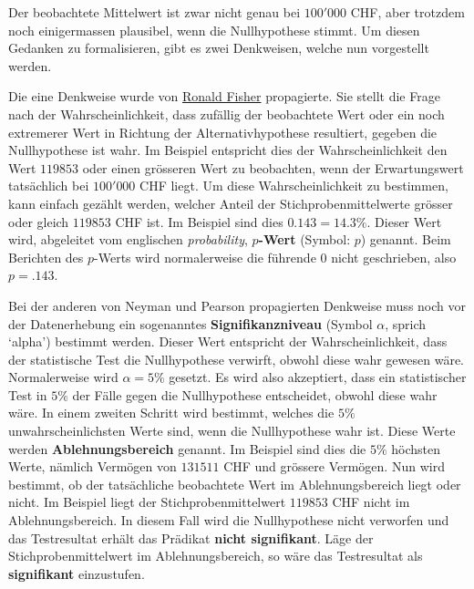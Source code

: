 \documentclass[
]{book}
\theoremstyle{definition}
\theoremstyle{definition}
\theoremstyle{definition}
\theoremstyle{definition}
\theoremstyle{remark}
\begin{document}
Der beobachtete Mittelwert ist zwar nicht genau bei \(100'000\) CHF, aber trotzdem noch einigermassen plausibel, wenn die Nullhypothese stimmt. Um diesen Gedanken zu formalisieren, gibt es zwei Denkweisen, welche nun vorgestellt werden.

Die eine Denkweise wurde von \href{https://en.wikipedia.org/wiki/Ronald_Fisher}{Ronald Fisher} propagierte. Sie stellt die Frage nach der Wahrscheinlichkeit, dass zufällig der beobachtete Wert oder ein noch extremerer Wert in Richtung der Alternativhypothese resultiert, gegeben die Nullhypothese ist wahr. Im Beispiel entspricht dies der Wahrscheinlichkeit den Wert \(119853\) oder einen grösseren Wert zu beobachten, wenn der Erwartungswert tatsächlich bei \(100'000\) CHF liegt. Um diese Wahrscheinlichkeit zu bestimmen, kann einfach gezählt werden, welcher Anteil der Stichprobenmittelwerte grösser oder gleich \(119853\) CHF ist. Im Beispiel sind dies \(0.143 = 14.3\%\). \label{customdef-pwert}{Dieser Wert wird, abgeleitet vom englischen \emph{probability}, \textbf{\(p\)-Wert} (Symbol: \(p\)) genannt. Beim Berichten des \(p\)-Werts wird normalerweise die führende \(0\) nicht geschrieben, also \(p = .143\).}

\label{customdef-signifikanzniveau}{Bei der anderen von Neyman und Pearson propagierten Denkweise muss noch vor der Datenerhebung ein sogenanntes \textbf{Signifikanzniveau} (Symbol \(\alpha\), sprich `alpha') bestimmt werden. Dieser Wert entspricht der Wahrscheinlichkeit, dass der statistische Test die Nullhypothese verwirft, obwohl diese wahr gewesen wäre. Normalerweise wird \(\alpha = 5\%\) gesetzt.} Es wird also akzeptiert, dass ein statistischer Test in \(5\%\) der Fälle gegen die Nullhypothese entscheidet, obwohl diese wahr wäre. \label{customdef-ablehnungsbereich}{In einem zweiten Schritt wird bestimmt, welches die \(5\%\) unwahrscheinlichsten Werte sind, wenn die Nullhypothese wahr ist. Diese Werte werden \textbf{Ablehnungsbereich} genannt.} Im Beispiel sind dies die \(5\%\) höchsten Werte, nämlich Vermögen von \(131511\) CHF und grössere Vermögen. Nun wird bestimmt, ob der tatsächliche beobachtete Wert im Ablehnungsbereich liegt oder nicht. \label{customdef-signifikanz}{Im Beispiel liegt der Stichprobenmittelwert \(119853\) CHF nicht im Ablehnungsbereich. In diesem Fall wird die Nullhypothese nicht verworfen und das Testresultat erhält das Prädikat \textbf{nicht signifikant}. Läge der Stichprobenmittelwert im Ablehnungsbereich, so wäre das Testresultat als \textbf{signifikant} einzustufen.}
\end{document}

